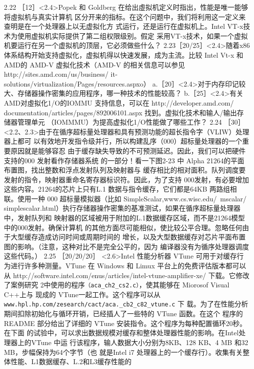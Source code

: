 2.22 ［12］<2.4>Popek 和 Goldberg 在给出虛拟机定义时指出，性能是唯一能够将虛拟机与真实计算机
区分开来的指标。在这个问题中，我们将利用这一定义来查明是在一个处理器上以无虚拟化方
式运行，还是运行在虚拟机上。Intel VT-x技术为使用虚拟机实际提供了第二组权限级别。假定
采用VT-x技术，如果一个虚拟机要运行在另一个虚拟机的顶层，它必须做些什么？
2.23［20/25］<2.4>随着x86体系结构开始支持虚拟化，虚拟机得以快速发展，成为主流。比较 Intel Vt-x
和 AMD的 AMD-V 虚拟化技术（AMD-V 的相关信息可以参见 http://sites.amd.com/us/business/
it-solutions/virtualization/Pages/resources.aspxo）
a.［20］<2.4>对于内存印记较大、存储器操作密集的应用程序，哪一种技术的性能较高？
b.［25］<2.4>有关 AMD对虛拟化1/O的IOMMU 支持信息，可以在 http://developer.amd.com/
documentation/articles/pages/892006101.aspx 找到。虚拟化技术和输人/输出存储器管理单元
（IOMMMU）为提高虚拟化1/O性能做了哪些工作？
2.24
［30］<2.2、2.3>由于在循序超标量处理器和具有预测功能的超长指令字（VLIW）处理器上都可
以有效地开发指令级并行，所以构建乱序（000）超标量处理器的一个重要原因就是能够容忍
由于缓存缺失导致的不可预测延迟。因此，我们可以把硬件支持的000 发射看作存储器系统
的一部分！看一下图2-23 中 Alpha 21264的平面布置图，找出整数和浮点发射队列及映射器与
缓存相比的相对面积。队列调度要发射的指令，映射器重命名寄存器标识符。因此，为了支持
000发射，有必要增加这些内容。21264的芯片上只有L.1 数据与指令缓存，它们都是64KB
两路组相联。使用一种 000 超标量模拟器（比如 SimpleScalar,www.cs.wisc.edu/~mscalar/
simplescalar.html）执行存储器操作密集的基准测试，如果在循序超标量处理器中，发射队列和
映射器的区域被用于附加的L.1数据缓存区域，而不是21264模型中的000发射。确保计算机
的其他方面尽可能相似，使比较公平合理。忽略任何由于大型缓存造成访问时间或周期时间的
增长，以及大型数据缓存对芯片平面布置图的影响。（注意，这种对比不是完全公平的，因为
编译器没有为循序处理器调度这些代码。）
2.25
［20/20/20］ <2.6>Intel 性能分析器 VTune 可用于对缓存行为进行许多种测量。VTune 在 Windows 和
Limux 平台上的免费评估版本都可以从 http://software.intel.com/enus/articles/intel-vtune-amplifier-xe/
下载。它修改了案例研究 2中使用的程序\verb|（aca_ch2_cs2.c）|，使其能够在 Miorosof Visual C++上与
现成的 VTune一起工作。这个程序可以从 \verb|www.hpl.hp.com/zesearch/cact/aca._cb2_c82_vtune.c| 下
载。为了在性能分析期间扣除初始化与循环开销，已经插人了一些特的 VTune 函数。在这个
程序的 README 部分给出了详细的 VTune 安装指令。这个程序为每种配置循环20秒。在下面
的试验中，可以求出数据规模对缓存和整体处理器性能的影响。在Intel处理器上的VTune 中运
行该程序，输人数据大小分别为8KB、128 KB、4 MB 和32 MB，步幅保持为64个字节（也
就是Intel i7 处理器上的一个缓存行）。收集有关整体性能、L1数据缓存、L.2和L3缓存性能的
